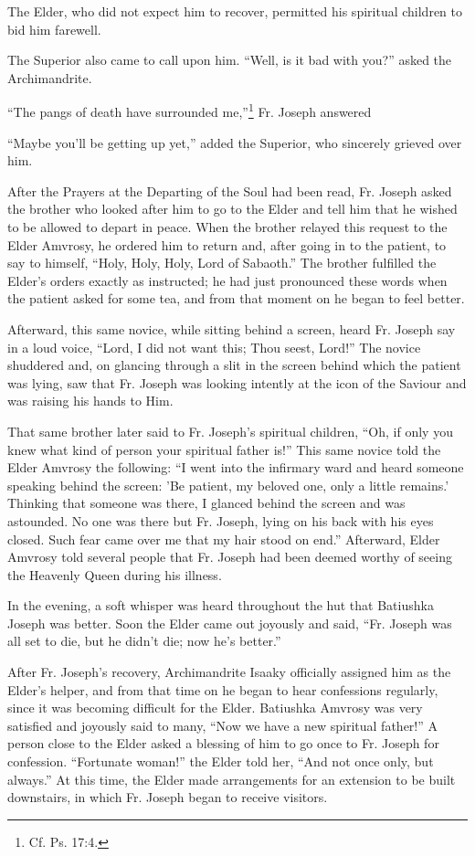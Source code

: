The Elder, who did not expect him to recover, permitted his spiritual children to bid him farewell.

The Superior also came to call upon him. “Well, is it bad with you?” asked the Archimandrite.

“The pangs of death have surrounded me,''\footnote{Cf. Ps. 17:4.} Fr. Joseph answered

“Maybe you'll be getting up yet,” added the Superior, who sincerely grieved over him.

After the Prayers at the Departing of the Soul had been read, Fr. Joseph asked the brother who looked after him to go to the Elder and tell him that he wished to be allowed to depart in peace. When the brother relayed this request to the Elder Amvrosy, he ordered him to return and, after going in to the patient, to say to himself, “Holy, Holy, Holy, Lord of Sabaoth.” The brother fulfilled the Elder's orders exactly as instructed; he had just pronounced these words when the patient asked for some tea, and from that moment on he began to feel better.

Afterward, this same novice, while sitting behind a screen, heard Fr. Joseph say in a loud voice, “Lord, I did not want this; Thou seest, Lord!” The novice shuddered and, on glancing through a slit in the screen behind which the patient was lying, saw that Fr. Joseph was looking intently at the icon of the Saviour and was raising his hands to Him.

That same brother later said to Fr. Joseph's spiritual children, “Oh, if only you knew what kind of person your spiritual father is!” This same novice told the Elder Amvrosy the following: “I went into the infirmary ward and heard someone speaking behind the screen: 'Be patient, my beloved one, only a little remains.' Thinking that someone was there, I glanced behind the screen and was astounded. No one was there but Fr. Joseph, lying on his back with his eyes closed. Such fear came over me that my hair stood on end.” Afterward, Elder Amvrosy told several people that Fr. Joseph had been deemed worthy of seeing the Heavenly Queen during his illness.

In the evening, a soft whisper was heard throughout the hut that Batiushka Joseph was better. Soon the Elder came out joyously and said, “Fr. Joseph was all set to die, but he didn't die; now he's better.”

After Fr. Joseph's recovery, Archimandrite Isaaky officially assigned him as the Elder's helper, and from that time on he began to hear confessions regularly, since it was becoming difficult for the Elder. Batiushka Amvrosy was very satisfied and joyously said to many, “Now we have a new spiritual father!” A person close to the Elder asked a blessing of him to go once to Fr. Joseph for confession. “Fortunate woman!” the Elder told her, “And not once only, but always.” At this time, the Elder made arrangements for an extension to be built downstairs, in which Fr. Joseph began to receive visitors.

